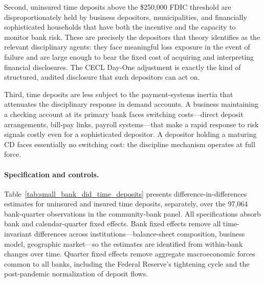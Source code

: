 Second, uninsured time deposits above the \$250{,}000 FDIC threshold are
disproportionately held by business depositors, municipalities, and financially
sophisticated households that have both the incentive and the capacity to monitor
bank risk. These are precisely the depositors that theory identifies as the
relevant disciplinary agents: they face meaningful loss exposure in the event of
failure and are large enough to bear the fixed cost of acquiring and interpreting
financial disclosures. The CECL Day-One adjustment is exactly the kind of
structured, audited disclosure that such depositors can act on.

Third, time deposits are less subject to the payment-systems inertia that
attenuates the disciplinary response in demand accounts. A business maintaining a
checking account at its primary bank faces switching costs---direct deposit
arrangements, bill-pay links, payroll systems---that make a rapid response to
risk signals costly even for a sophisticated depositor. A depositor holding a
maturing CD faces essentially no switching cost: the discipline mechanism
operates at full force.

\paragraph{Specification and controls.}
Table~\ref{tab:small_bank_did_time_deposits} presents difference-in-differences
estimates for uninsured and insured time deposits, separately, over the 97,064
bank-quarter observations in the community-bank panel. All specifications absorb
bank and calendar-quarter fixed effects. Bank fixed effects remove all
time-invariant differences across institutions---balance-sheet composition,
business model, geographic market---so the estimates are identified from
within-bank changes over time. Quarter fixed effects remove aggregate
macroeconomic forces common to all banks, including the Federal Reserve's
tightening cycle and the post-pandemic normalization of deposit flows.

